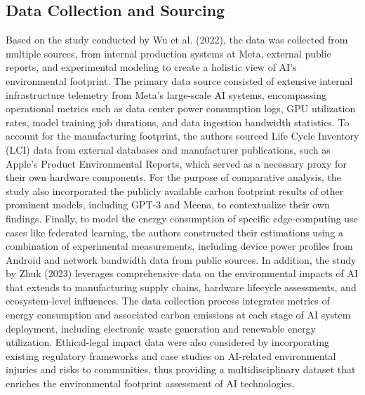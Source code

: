 \documentclass[a4paper, 12pt]{article}
\begin{document}
\subsection{Data Collection and Sourcing}
\hspace{24pt}Based on the study conducted by Wu et al. (2022), the data was collected from multiple sources, from internal production systems at Meta, external public reports, and experimental modeling to create a holistic view of AI's environmental footprint. The primary data source consisted of extensive internal infrastructure telemetry from Meta's large-scale AI systems, encompassing operational metrics such as data center power consumption logs, GPU utilization rates, model training job durations, and data ingestion bandwidth statistics. To account for the manufacturing footprint, the authors sourced Life Cycle Inventory (LCI) data from external databases and manufacturer publications, such as Apple's Product Environmental Reports, which served as a necessary proxy for their own hardware components. For the purpose of comparative analysis, the study also incorporated the publicly available carbon footprint results of other prominent models, including GPT-3 and Meena, to contextualize their own findings. Finally, to model the energy consumption of specific edge-computing use cases like federated learning, the authors constructed their estimations using a combination of experimental measurements, including device power profiles from Android and network bandwidth data from public sources.
In addition, the study by Zhuk (2023) leverages comprehensive data on the environmental impacts of AI that extends to manufacturing supply chains, hardware lifecycle assessments, and ecosystem-level influences. The data collection process integrates metrics of energy consumption and associated carbon emissions at each stage of AI system deployment, including electronic waste generation and renewable energy utilization. Ethical-legal impact data were also considered by incorporating existing regulatory frameworks and case studies on AI-related environmental injuries and risks to communities, thus providing a multidisciplinary dataset that enriches the environmental footprint assessment of AI technologies.
\end{document}

